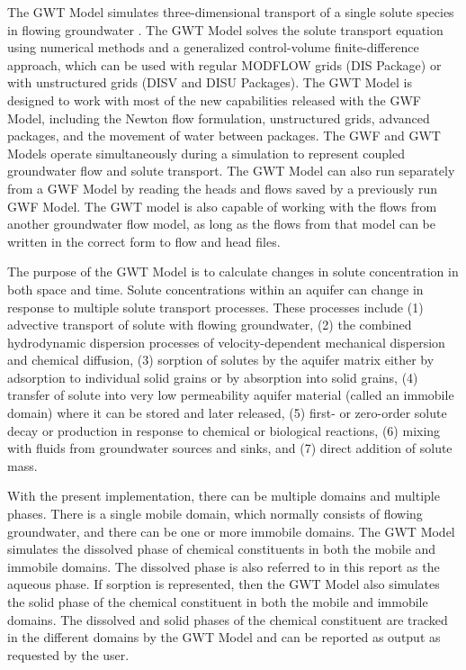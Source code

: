 The GWT Model simulates three-dimensional transport of a single solute species in flowing groundwater \citep{modflow6gwt}.  The GWT Model solves the solute transport equation using numerical methods and a generalized control-volume finite-difference approach, which can be used with regular MODFLOW grids (DIS Package) or with unstructured grids (DISV and DISU Packages).  The GWT Model is designed to work with most of the new capabilities released with the GWF Model, including the Newton flow formulation, unstructured grids, advanced packages, and the movement of water between packages.  The GWF and GWT Models operate simultaneously during a \mf simulation to represent coupled groundwater flow and solute transport.  The GWT Model can also run separately from a GWF Model by reading the heads and flows saved by a previously run GWF Model.  The GWT model is also capable of working with the flows from another groundwater flow model, as long as the flows from that model can be written in the correct form to flow and head files.  

The purpose of the GWT Model is to calculate changes in solute concentration in both space and time.  Solute concentrations within an aquifer can change in response to multiple solute transport processes.  These processes include (1) advective transport of solute with flowing groundwater, (2) the combined hydrodynamic dispersion processes of velocity-dependent mechanical dispersion and chemical diffusion, (3) sorption of solutes by the aquifer matrix either by adsorption to individual solid grains or by absorption into solid grains, (4) transfer of solute into very low permeability aquifer material (called an immobile domain) where it can be stored and later released, (5) first- or zero-order solute decay or production in response to chemical or biological reactions, (6) mixing with fluids from groundwater sources and sinks, and (7) direct addition of solute mass.

With the present implementation, there can be multiple domains and multiple phases.  There is a single mobile domain, which normally consists of flowing groundwater, and there can be one or more immobile domains.  The GWT Model simulates the dissolved phase of chemical constituents in both the mobile and immobile domains.  The dissolved phase is also referred to in this report as the aqueous phase.  If sorption is represented, then the GWT Model also simulates the solid phase of the chemical constituent in both the mobile and immobile domains.  The dissolved and solid phases of the chemical constituent are tracked in the different domains by the GWT Model and can be reported as output as requested by the user.

